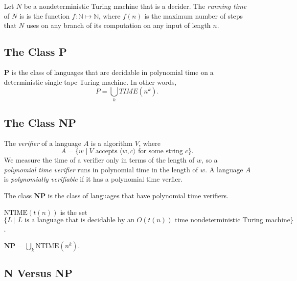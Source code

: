 \documentclass[11pt]{article}
\begin{document}
\begin{definition}
Let $N$ be a nondeterministic Turing machine that is a decider. The \emph{running time} of $N$ is
is the function $f: \mathbb{N} \mapsto \mathbb{N}$, where $f(n)$ is the maximum number of steps
that $N$ uses on any branch of its computation on any input of length $n$.
\end{definition}

\subsection{The Class P}

\begin{definition}
\textbf{P} is the class of languages that are decidable in polynomial time on a deterministic
single-tape Turing machine. In other words,
\[
  P = \bigcup_k TIME(n^k).
\]
\end{definition}

\subsection{The Class NP}

\begin{definition}
The \emph{verifier} of a language $A$ is a algorithm $V$, where
\[
  A = \{w \mid V \text{ accepts }\langle w,c \rangle \text{ for some string }c\}.
\]
We measure the time of a verifier only in terms of the length of $w$, so a \emph{polynomial time
verifier} runs in polynomial time in the length of $w$. A language $A$ is \emph{polynomially
verifiable} if it has a polynomial time verfier.
\end{definition}

\begin{definition}
The class \textbf{NP} is the class of languages that have polynomial time verifiers.
\end{definition}

\begin{definition}
$\mathrm{NTIME}(t(n))$ is the set \\ $\{L \mid L \text{ is a language that is decidable by an }
O(t(n)) \text{ time nondeterministic Turing machine}\}$.
\end{definition}

\begin{corollary}
$\textbf{NP} = \bigcup_k \mathrm{NTIME}(n^k)$.
\end{corollary}

\subsection{N Versus NP}
\end{document}
